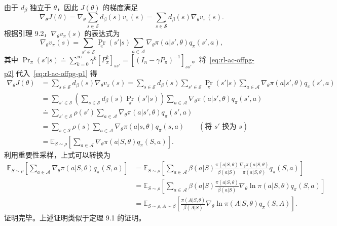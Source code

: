 \begin{derivation}\label{box:rl-ac-offpg-proof}
由于 $d_{\beta}$ 独立于 $\theta$，因此 $J(\theta)$ 的梯度满足
\begin{equation}
\nabla_{\theta} J(\theta) = \nabla_{\theta} \sum_{s \in \mathcal{S}} d_{\beta}(s) v_{\pi}(s) = \sum_{s \in \mathcal{S}} d_{\beta}(s) \nabla_{\theta} v_{\pi}(s).
\label{eq:rl-ac-offpg-p1}
\end{equation}
根据引理 9.2，$\nabla_{\theta} v_{\pi}(s)$ 的表达式为
\begin{equation}
\nabla_{\theta} v_{\pi}(s) = \sum_{s' \in \mathcal{S}} \operatorname{Pr}_{\pi}(s' | s) \sum_{a \in \mathcal{A}} \nabla_{\theta} \pi(a | s', \theta) q_{\pi}(s', a),
\label{eq:rl-ac-offpg-p2}
\end{equation}
其中 $\operatorname{Pr}_{\pi}(s' | s) \doteq \sum_{k=0}^{\infty} \gamma^{k} [P_{\pi}^{k}]_{ss'} = \left[ (I_{n} - \gamma P_{\pi})^{-1} \right]_{ss'}$。将~\eqref{eq:rl-ac-offpg-p2} 代入~\eqref{eq:rl-ac-offpg-p1} 得
\[
\begin{aligned}
\nabla_{\theta} J(\theta) &= \sum_{s \in \mathcal{S}} d_{\beta}(s) \nabla_{\theta} v_{\pi}(s) = \sum_{s \in \mathcal{S}} d_{\beta}(s) \sum_{s' \in \mathcal{S}} \operatorname{Pr}_{\pi}(s' | s) \sum_{a \in \mathcal{A}} \nabla_{\theta} \pi(a | s', \theta) q_{\pi}(s', a) \\
&= \sum_{s' \in \mathcal{S}} \left( \sum_{s \in \mathcal{S}} d_{\beta}(s) \operatorname{Pr}_{\pi}(s' | s) \right) \sum_{a \in \mathcal{A}} \nabla_{\theta} \pi(a | s', \theta) q_{\pi}(s', a) \\
&\doteq \sum_{s' \in \mathcal{S}} \rho(s') \sum_{a \in \mathcal{A}} \nabla_{\theta} \pi(a | s', \theta) q_{\pi}(s', a) \\
&= \sum_{s \in \mathcal{S}} \rho(s) \sum_{a \in \mathcal{A}} \nabla_{\theta} \pi(a | s, \theta) q_{\pi}(s, a) \qquad (\text{将 } s' \text{ 换为 } s) \\
&= \mathbb{E}_{S \sim \rho} \left[ \sum_{a \in \mathcal{A}} \nabla_{\theta} \pi(a | S, \theta) q_{\pi}(S, a) \right].
\end{aligned}
\]
利用重要性采样，上式可以转换为
\[
\begin{aligned}
\mathbb{E}_{S \sim \rho} \left[ \sum_{a \in \mathcal{A}} \nabla_{\theta} \pi(a | S, \theta) q_{\pi}(S, a) \right]
&= \mathbb{E}_{S \sim \rho} \left[ \sum_{a \in \mathcal{A}} \beta(a | S) \frac{\pi(a | S, \theta)}{\beta(a | S)} \frac{\nabla_{\theta} \pi(a | S, \theta)}{\pi(a | S, \theta)} q_{\pi}(S, a) \right] \\
&= \mathbb{E}_{S \sim \rho} \left[ \sum_{a \in \mathcal{A}} \beta(a | S) \frac{\pi(a | S, \theta)}{\beta(a | S)} \nabla_{\theta} \ln \pi(a | S, \theta) q_{\pi}(S, a) \right] \\
&= \mathbb{E}_{S \sim \rho, A \sim \beta} \left[ \frac{\pi(A | S, \theta)}{\beta(A | S)} \nabla_{\theta} \ln \pi(A | S, \theta) q_{\pi}(S, A) \right].
\end{aligned}
\]
证明完毕。上述证明类似于定理 9.1 的证明。
\end{derivation}

